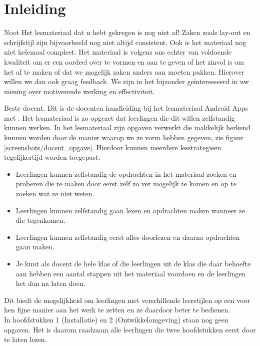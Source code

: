 \documentclass{BYUTextbook}
\begin{document}
\cleardoublepage

\tableofcontents

\mainmatter

\chapter{Inleiding}
\begin{derivation}{Noot}
  Het lesmateriaal dat u hebt gekregen is nog niet af! Zaken zoals lay-out en schrijfstijl zijn bijvoorbeeld nog niet altijd consistent. Ook is het materiaal nog niet helemaal compleet. Het materiaal is volgens ons echter van voldoende kwaliteit om er een oordeel over te vormen en aan te geven of het zinvol is om het af te maken of dat we mogelijk zaken anders aan moeten pakken. Hierover willen we dan ook graag feedback. We zijn in het bijzonder ge\"interesseerd in uw mening over motiverende werking en effectiviteit.
\end{derivation}

Beste docent. Dit is de docenten handleiding bij het lesmateriaal Android Apps met \ai. Het lesmateriaal is zo opgezet dat leerlingen die dit willen zelfstandig kunnen werken. In het lesmateriaal zijn opgaven verwerkt die makkelijk herkend kunnen worden door de manier waarop we ze vorm hebben gegeven, zie figuur \ref{screenshots/docent_opgave}. Hierdoor kunnen meerdere lesstrategie\"en tegelijkertijd worden toegepast:

\begin{itemize}
  \item Leerlingen kunnen zelfstandig de opdrachten in het materiaal zoeken en proberen die te maken door eerst zelf zo ver mogelijk te komen en op te zoeken wat ze niet weten.
  \item Leerlingen kunnen zelfstandig gaan lezen en opdrachten maken wanneer ze die tegenkomen.
  \item Leerlingen kunnen zelfstandig eerst alles doorlezen en daarna opdrachten gaan maken.
  \item Je kunt als docent de hele klas of die leerlingen uit de klas die daar behoefte aan hebben een aantal stappen uit het materiaal voordoen en de leerlingen het dan na laten doen.
\end{itemize}

Dit biedt de mogelijkheid om leerlingen met verschillende leerstijlen op een voor hen fijne manier aan het werk te zetten en ze daardoor beter te bedienen. \\
In hoofdstukken 1 (Installatie) en 2 (Ontwikkelomgeving) staan nog geen opgaven. Het is daarom raadzaam alle leerlingen die twee hoofdstukken eerst door te laten lezen.
\end{document}
